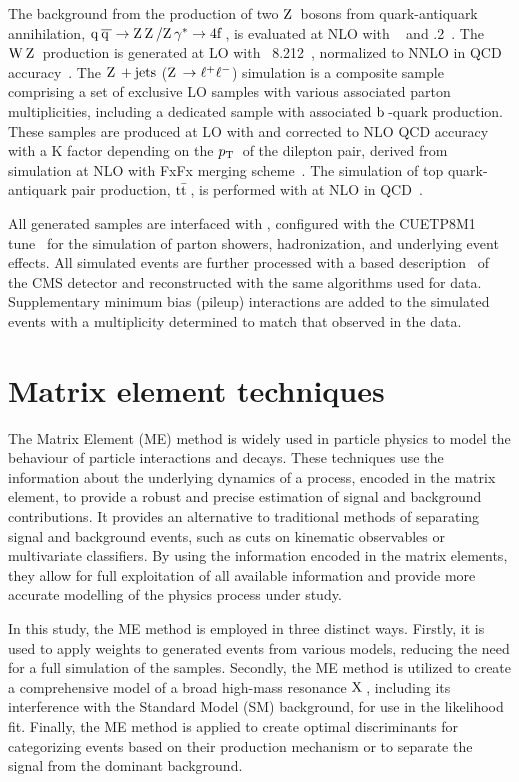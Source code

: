 The background from the production of two $\mathrm{Z}\hspace{0.2em}$ bosons from quark-antiquark annihilation, $\mathrm{q}\hspace{0.2em}\overline{\mathrm{q}\hspace{0.2em}} \to \mathrm{Z}\hspace{0.2em}\mathrm{Z}\hspace{0.2em}/ \mathrm{Z}\hspace{0.2em}\gamma^*\to 4 \textrm{f}\hspace{0.2em}$, is evaluated at NLO with \POWHEG~\cite{Nason:2013ydw} and .2~\cite{MadGraph}. The $\mathrm{W}\hspace{0.2em}\mathrm{Z}\hspace{0.2em}$ production is generated at LO with \PYTHIA\ 8.212~\cite{Sjostrand:2008za}, normalized to NNLO in QCD accuracy~\cite{Grazzini:2016swo}. The $\mathrm{Z}\hspace{0.2em} + \text{jets}$ ($\mathrm{Z}\hspace{0.2em}\to\ell^+\ell^-$) simulation is a composite sample comprising a set of exclusive LO samples with various associated parton multiplicities, including a dedicated sample with associated $\mathrm{b}\hspace{0.2em}$-quark production. These samples are produced at LO with \MGvATNLO and corrected to NLO QCD accuracy with a K factor depending on the $p_\mathrm{T}\hspace{0.2em}$ of the dilepton pair, derived from \MGvATNLO simulation at NLO with FxFx merging scheme~\cite{Frederix:2012ps}. The simulation of top quark-antiquark pair production, $\mathrm{t\bar{t}}\hspace{0.2em}$, is performed with \POWHEG{} at NLO in QCD~\cite{Frixione:2007nw}.

All generated samples are interfaced with \PYTHIA, configured with the CUETP8M1 tune~\cite{CUETP8M1} for the simulation of parton showers, hadronization, and underlying event effects. All simulated events are further processed with a \GEANTfour{} based description~\cite{Agostinelli2003250} of the CMS detector and reconstructed with the same algorithms used for data. Supplementary minimum bias (pileup) interactions are added to the simulated events with a multiplicity determined to match that observed in the data.

\section{Matrix element techniques}
The Matrix Element (ME) method is widely used in particle physics to model the behaviour of particle interactions and decays.
These techniques use the information about the underlying dynamics of a process, encoded in the matrix element, to provide a robust and precise estimation of signal and background contributions.
It provides an alternative to traditional methods of separating signal and background events, such as cuts on kinematic observables or multivariate classifiers.
By using the information encoded in the matrix elements, they allow for full exploitation of all available information and provide more accurate modelling of the physics process under study.


In this study, the ME method is employed in three distinct ways. Firstly, it is used to apply weights to generated events from various models, reducing the need for a full simulation of the samples. Secondly, the ME method is utilized to create a comprehensive model of a broad high-mass resonance $\mathrm{X}\hspace{0.2em}$, including its interference with the Standard Model (SM) background, for use in the likelihood fit. Finally, the ME method is applied to create optimal discriminants for categorizing events based on their production mechanism or to separate the signal from the dominant background.

